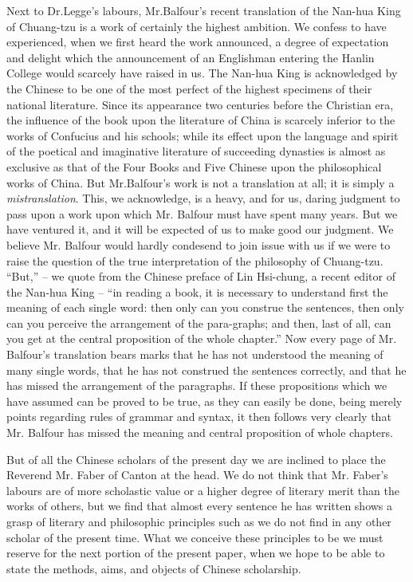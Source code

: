 Next to Dr.Legge's labours, Mr.Balfour's recent translation of the Nan-hua King of Chuang-tzu is a work of certainly the highest ambition.
We confess to have experienced, when we first heard the work announced,
a degree of expectation and delight which the announcement of an Englishman entering the Hanlin College would scarcely have raised in us.
The Nan-hua King is acknowledged by the Chinese to be one of the most perfect of the highest specimens of their national literature.
Since its appearance two centuries before the Christian era,
the influence of the book upon the literature of China is scarcely inferior to the works of Confucius and his schools;
while its effect upon the language and spirit of the poetical
and imaginative literature of succeeding dynasties is almost as exclusive as
that of the Four Books and Five Chinese upon the philosophical works of China.
But Mr.Balfour's work is not a translation at all;
it is simply a \emph{mistranslation}.
This, we acknowledge, is a heavy, and for us,
daring judgment to pass upon a work upon which Mr. Balfour must have spent many years.
But we have ventured it,
and it will be expected of us to make good our judgment.
We believe Mr. Balfour would hardly condesend to join issue with us
if we were to raise the question of the true interpretation of the philosophy of Chuang-tzu. ``But,''
-- we quote from the Chinese preface of Lin Hsi-chung, a recent editor of the Nan-hua King --
``in reading a book, it is necessary to understand first the meaning of each single word:
then only can you construe the sentences,
then only can you perceive the arrangement of the para-graphs;
and then, last of all, can you get at the central proposition of the whole chapter.''
Now every page of Mr. Balfour's translation bears marks
that he has not understood the meaning of many single words,
that he has not construed the sentences correctly,
and that he has missed the arrangement of the paragraphs.
If these propositions which we have assumed can be proved to be true,
as they can easily be done, being merely points regarding rules of grammar and syntax,
it then follows very clearly that Mr. Balfour has missed the meaning and central proposition of whole chapters.

But of all the Chinese scholars of the present day we are inclined to place the Reverend Mr. Faber of Canton at the head.
We do not think that Mr. Faber's labours are of more scholastic value or a higher degree of literary merit than the works of others,
but we find that almost every sentence he has written shows a grasp of literary and philosophic principles such as we do not find in any other scholar of the present time.
What we conceive these principles to be we must reserve for the next portion of the present paper,
when we hope to be able to state the methods, aims, and objects of Chinese scholarship.
